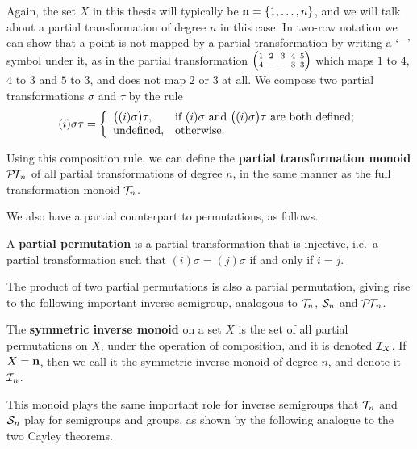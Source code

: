 Again, the set $X$ in this thesis will typically be $\mathbf{n} = \{1, \ldots, n\}$,
and we will talk about a partial transformation of degree $n$ in this case.  In
two-row notation we can show that a point is not mapped by a partial
transformation by writing a `$-$' symbol under it, as in the partial
transformation $\transV4--33$ which maps $1$ to $4$, $4$ to $3$ and $5$ to $3$,
and does not map $2$ or $3$ at all.  We compose two partial transformations
$\sigma$ and $\tau$ by the rule
$$(i)\sigma\tau = \left\{
  \begin{array}{l l}
    \big((i)\sigma\big)\tau,
    & \text{if~} (i)\sigma \text{~and~}
      \big((i)\sigma\big)\tau \text{~are both defined;} \\
    \text{undefined}, & \text{otherwise.}
  \end{array}
\right.$$

Using this composition rule, we can define the \textbf{partial
  transformation monoid} $\mathcal{P\!T\!}_n$ of all partial transformations of degree $n$,
in the same manner as the full transformation monoid $\mathcal{T}_n$.

We also have a partial counterpart to permutations, as follows.

\begin{definition}
  \label{def:partial-perm}
  A \textbf{partial permutation} is a partial transformation that is injective,
  i.e.~a partial transformation such that $(i)\sigma=(j)\sigma$ if and only if
  $i=j$.
\end{definition}

The product of two partial permutations is also a partial permutation, giving
rise to the following important inverse semigroup, analogous to $\mathcal{T}_n$, $\mathcal{S}_n$
and $\mathcal{P\!T\!}_n$.

\begin{definition}
  \label{def:in}
  The \textbf{symmetric inverse monoid} on a set $X$ is the set of all partial
  permutations on $X$, under the operation of composition, and it is denoted
  $\mathcal{I}_X$.  If $X = \mathbf{n}$, then we call it the symmetric inverse monoid of degree
  $n$, and denote it $\mathcal{I}_n$.
\end{definition}

This monoid plays the same important role for inverse semigroups that $\mathcal{T}_n$ and
$\mathcal{S}_n$ play for semigroups and groups, as shown by the following analogue to
the two Cayley theorems.

